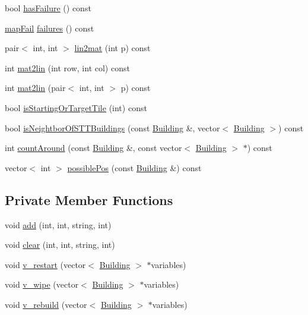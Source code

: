 \begin{DoxyCompactItemize}
\item 
bool \hyperlink{classghost_1_1WallinDomain_a6f7e5faed20866178aef2a304f0a0856}{has\-Failure} () const 
\item 
\hyperlink{namespaceghost_af44c393431f46e255b1c303cd50854b8}{map\-Fail} \hyperlink{classghost_1_1WallinDomain_a070f1fe50460d46a85e6a497b09b8626}{failures} () const 
\item 
pair$<$ int, int $>$ \hyperlink{classghost_1_1WallinDomain_a99033370b8ec23bd76ae616573468a58}{lin2mat} (int p) const 
\item 
int \hyperlink{classghost_1_1WallinDomain_aa046dc48e23d97c260e21fb7671800c5}{mat2lin} (int row, int col) const 
\item 
int \hyperlink{classghost_1_1WallinDomain_a79ed19b2aaab5d00a7103190f83ea8ba}{mat2lin} (pair$<$ int, int $>$ p) const 
\item 
bool \hyperlink{classghost_1_1WallinDomain_aefedba561d23ec8ae7a9f3dca7b58565}{is\-Starting\-Or\-Target\-Tile} (int) const 
\item 
bool \hyperlink{classghost_1_1WallinDomain_a889f4bf4cbc323e7ece3e05a96f96691}{is\-Neightbor\-Of\-S\-T\-T\-Buildings} (const \hyperlink{classghost_1_1Building}{Building} \&, vector$<$ \hyperlink{classghost_1_1Building}{Building} $>$) const 
\item 
int \hyperlink{classghost_1_1WallinDomain_ad67a6d2ae03800594475e081af2d5136}{count\-Around} (const \hyperlink{classghost_1_1Building}{Building} \&, const vector$<$ \hyperlink{classghost_1_1Building}{Building} $>$ $\ast$) const 
\item 
vector$<$ int $>$ \hyperlink{classghost_1_1WallinDomain_ab4441d234f628c487742480107fcdd6d}{possible\-Pos} (const \hyperlink{classghost_1_1Building}{Building} \&) const 
\end{DoxyCompactItemize}
\subsection*{Private Member Functions}
\begin{DoxyCompactItemize}
\item 
void \hyperlink{classghost_1_1WallinDomain_a6fcb3370e7a7df62156c556b381c78f7}{add} (int, int, string, int)
\item 
void \hyperlink{classghost_1_1WallinDomain_ae6903c1353bafc1269ad1fa8fcd158ee}{clear} (int, int, string, int)
\item 
void \hyperlink{classghost_1_1WallinDomain_aad60a94ecdc1a63cc0ff2a5ab3079c46}{v\-\_\-restart} (vector$<$ \hyperlink{classghost_1_1Building}{Building} $>$ $\ast$variables)
\item 
void \hyperlink{classghost_1_1WallinDomain_a816435b0754c2b62b916b59d60677742}{v\-\_\-wipe} (vector$<$ \hyperlink{classghost_1_1Building}{Building} $>$ $\ast$variables)
\item 
void \hyperlink{classghost_1_1WallinDomain_af296daeef852ce0d84e01fccac4c0f48}{v\-\_\-rebuild} (vector$<$ \hyperlink{classghost_1_1Building}{Building} $>$ $\ast$variables)
\end{DoxyCompactItemize}
